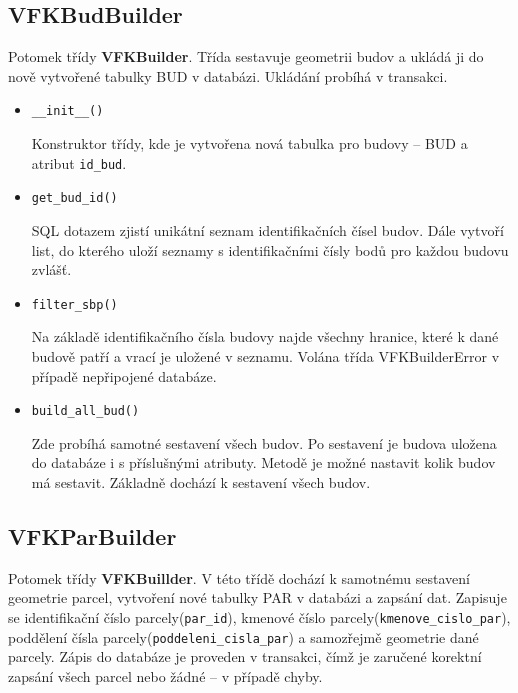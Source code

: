 \subsection{VFKBudBuilder}
Potomek třídy \textbf{VFKBuilder}. Třída sestavuje geometrii budov a ukládá ji do nově vytvořené tabulky BUD v databázi. Ukládání probíhá v transakci.
\begin{itemize}
\item \verb|__init__()|

Konstruktor třídy, kde je vytvořena nová tabulka pro budovy -- BUD a atribut \verb|id_bud|.
\item \verb|get_bud_id()|

SQL dotazem zjistí unikátní seznam identifikačních čísel budov. Dále vytvoří list, do kterého uloží seznamy s identifikačními čísly bodů pro každou budovu zvlášť.
\item \verb|filter_sbp()|

Na základě identifikačního čísla budovy najde všechny hranice, které k dané budově patří a vrací je uložené v seznamu. Volána třída VFKBuilderError v případě nepřipojené databáze.
\item \verb|build_all_bud()|

Zde probíhá samotné sestavení všech budov. Po sestavení je budova uložena do databáze i s příslušnými atributy. Metodě je možné nastavit kolik budov má sestavit. Základně dochází k sestavení všech budov.
\end{itemize}
\subsection{VFKParBuilder}
Potomek třídy \textbf{VFKBuillder}. V této třídě dochází k samotnému sestavení geometrie parcel, vytvoření nové tabulky PAR v databázi a zapsání dat. Zapisuje se identifikační číslo parcely(\verb|par_id|), kmenové číslo parcely(\verb|kmenove_cislo_par|), poddělení čísla parcely(\verb|poddeleni_cisla_par|) a samozřejmě geometrie dané parcely. Zápis do databáze je proveden v transakci, čímž je zaručené korektní zapsání všech parcel nebo žádné -- v případě chyby.

